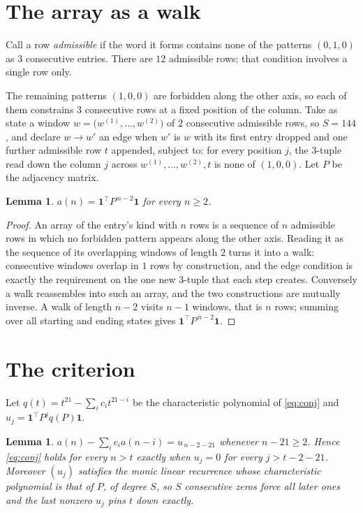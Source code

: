 \documentclass[11pt,a4paper]{article}
\theoremstyle{plain}
\newtheorem{lemma}[theorem]{Lemma}
\theoremstyle{definition}
\begin{document}
\section{The array as a walk}

Call a row \emph{admissible} if the word it forms contains none of the patterns
$(0,1,0)$ as $3$ consecutive entries. There are $12$ admissible rows; that condition
involves a single row only.

The remaining patterns $(1,0,0)$ are forbidden along the other axis, so each of them
constrains $3$ consecutive rows at a fixed position of the column. Take as state a
window $w=\bigl(w^{(1)},\dots,w^{(2)}\bigr)$ of $2$ consecutive admissible
rows, so $S=144$, and declare $w\to w'$ an edge when $w'$ is $w$ with its first entry
dropped and one further admissible row $t$ appended, subject to: for every position
$j$, the $3$-tuple read down the column $j$ across $w^{(1)},\dots,w^{(2)},t$
is none of $(1,0,0)$. Let $P$ be the adjacency matrix.

\begin{lemma}\label{lem:walk}
$a(n)=\mathbf{1}^{\!\top}P^{\,n-2}\mathbf{1}$ for every $n\ge2$.
\end{lemma}

\begin{proof}
An array of the entry's kind with $n$ rows is a sequence of $n$ admissible rows in
which no forbidden pattern appears along the other axis. Reading it as the sequence of its
overlapping windows of length $2$ turns it into a walk: consecutive windows overlap in
$1$ rows by construction, and the edge condition is exactly the requirement on the one
new $3$-tuple that each step creates. Conversely a walk reassembles into such an array,
and the two constructions are mutually inverse. A walk of length $n-2$ visits $n-1$
windows, that is $n$ rows; summing over all starting and ending states gives
$\mathbf{1}^{\!\top}P^{\,n-2}\mathbf{1}$.
\end{proof}

\section{The criterion}

Let $q(t)=t^{21}-\sum_i c_i t^{21-i}$ be the characteristic polynomial of
\eqref{eq:conj} and $u_j=\mathbf{1}^{\!\top}P^{j}q(P)\mathbf{1}$.

\begin{lemma}\label{lem:crit}
$a(n)-\sum_i c_i a(n-i)=u_{\,n-2-21}$ whenever $n-21\ge2$. Hence
\eqref{eq:conj} holds for every $n>t$ exactly when $u_j=0$ for every
$j>t-2-21$. Moreover $(u_j)$ satisfies the monic linear recurrence whose
characteristic polynomial is that of $P$, of degree $S$, so $S$ consecutive zeros force all
later ones and the last nonzero $u_j$ pins $t$ down exactly.
\end{lemma}
\end{document}
